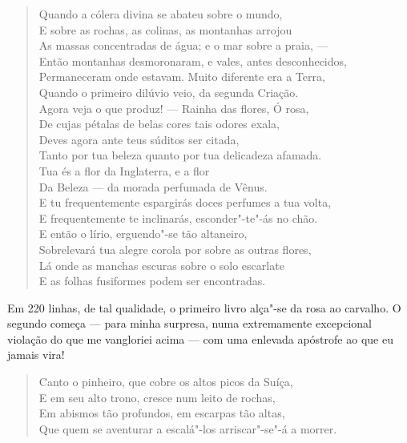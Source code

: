 \begin{verse}
Quando a cólera divina se abateu sobre o mundo,\\
E sobre as rochas, as colinas, as montanhas arrojou\\
As massas concentradas de água; e o mar sobre a praia, ---\\
Então montanhas desmoronaram, e vales, antes desconhecidos,\\
Permaneceram onde estavam. Muito diferente era a Terra,\\
Quando o primeiro dilúvio veio, da segunda Criação.\\
Agora veja o que produz! --- Rainha das flores, Ó rosa,\\
De cujas pétalas de belas cores tais odores exala,\\
Deves agora ante teus súditos ser citada,\\
Tanto por tua beleza quanto por tua delicadeza afamada.\\
Tua és a flor da Inglaterra, e a flor\\
Da Beleza --- da morada perfumada de Vênus.\\
E tu frequentemente espargirás doces perfumes a tua volta,\\
E frequentemente te inclinarás, esconder"-te"-ás no chão.\footnotemark\\
E então o lírio, erguendo"-se tão altaneiro,\\
Sobrelevará tua alegre corola por sobre as outras flores,\\
Lá onde as manchas escuras sobre o solo escarlate\\
E as folhas fusiformes podem ser encontradas.
\end{verse}

Em 220 linhas, de tal qualidade, o primeiro livro alça"-se da rosa ao
carvalho. O segundo começa --- para minha surpresa, numa extremamente
excepcional violação do que me vangloriei acima --- com uma enlevada
apóstrofe ao que eu jamais vira!

\begin{verse}
Canto o pinheiro, que cobre os altos picos da Suíça\footnotemark,\\
E em seu alto trono, cresce num leito de rochas,\\
Em abismos tão profundos, em escarpas tão altas,\\
Que quem se aventurar a escalá"-los arriscar"-se"-á a morrer.
\end{verse}

